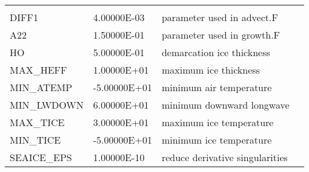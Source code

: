 \begin{table}[h!]
{\begin{tabular}{|lllc|}
    &  %
    \\
   DIFF1               &                   4.00000E-03
    &   parameter used in advect.F 
    &  %
    \\
   A22                 &                   1.50000E-01
    &   parameter used in growth.F 
    &  %
    \\
   HO                  &                   5.00000E-01
    &   demarcation ice thickness 
    &  %
    \\
   MAX\_HEFF            &                   1.00000E+01
    &   maximum ice thickness 
    &  %
    \\
   MIN\_ATEMP           &                  -5.00000E+01
    &   minimum air temperature 
    &  %
    \\
   MIN\_LWDOWN          &                   6.00000E+01
    &   minimum downward longwave 
    &  %
    \\
   MAX\_TICE            &                   3.00000E+01
    &   maximum ice temperature 
    &  %
    \\
   MIN\_TICE            &                  -5.00000E+01
    &   minimum ice temperature 
    &  %
    \\
   SEAICE\_EPS          &                   1.00000E-10
    &   reduce derivative singularities 
    &  %
    \\
\hline
\end{tabular}
}
\end{table}

